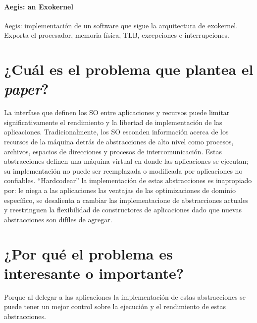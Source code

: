 \paragraph{\textnormal{\textbf{Aegis: an Exokernel}}}
Aegis: implementación de un software que sigue la arquitectura de exokernel. Exporta el procesador, memoria física, TLB, excepciones e interrupciones.
 

\section{¿Cuál es el problema que plantea el \textit{paper}?}
La interfase que definen los SO entre aplicaciones y recursos puede limitar significativamente el rendimiento y la libertad de implementación de las aplicaciones. Tradicionalmente, los SO esconden información acerca de los recursos de la máquina detrás de abstracciones de alto nivel como procesos, archivos, espacios de direcciones y procesos de intercomunicación. Estas abstracciones definen una máquina virtual en donde las aplicaciones se ejecutan; su implementación no puede ser reemplazada o modificada por aplicaciones no confiables. ``Hardcodear'' la implementación de estas abstracciones es inapropiado por: le niega a las aplicaciones las ventajas de las optimizaciones de dominio específico, se desalienta a cambiar las implementacione de abstracciones actuales y reestringuen la flexibilidad de constructores de aplicaciones dado que nuevas abstracciones son difíles de agregar.

\section{¿Por qué el problema es interesante o importante?}
Porque al delegar a las aplicaciones la implementación de estas abstracciones se puede tener un mejor control sobre la ejecución y el rendimiento de estas abstracciones.  

